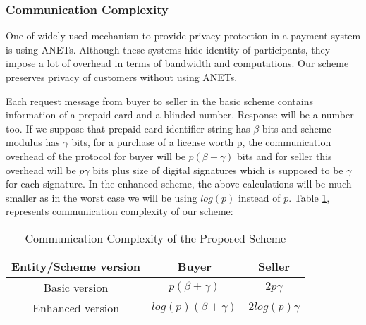 \documentclass[times]{secauth}
\begin{document}
\subsubsection{Communication Complexity}
One of widely used mechanism to provide privacy protection in a payment system is using ANETs. Although these systems hide identity of participants, they impose a lot of overhead in terms of bandwidth and computations. Our scheme preserves privacy of customers without using ANETs.
\par Each request message from buyer to seller in the basic scheme contains information of a prepaid card and a blinded number. Response will be a number too. If we suppose that prepaid-card identifier string has $\beta$ bits and scheme modulus has $\gamma$ bits, for a purchase of a license worth p, the communication overhead of the protocol for buyer will be $p(\beta+\gamma)$ bits and for seller this overhead will be $p\gamma$ bits plus size of digital signatures which is supposed to be $\gamma$ for each signature.
In the enhanced scheme, the above calculations will be much smaller as in the worst case we will be using $log(p)$ instead of $p$. 
Table \ref{table:commproposed}, represents communication complexity of our scheme:

\begin{table}
\caption{Communication Complexity of the Proposed Scheme}
\begin{tabular}{|c|c|c|}
\hline \textbf{Entity/Scheme version} & \textbf{Buyer} & \textbf{Seller} \\ 
\hline Basic version & $p(\beta + \gamma)$ & $2p\gamma$ \\ 
\hline Enhanced version & $log(p)(\beta + \gamma)$ & $2log(p)\gamma$ \\ 
\hline 
\end{tabular} 
\label{table:commproposed}
\end{table}
\end{document}
